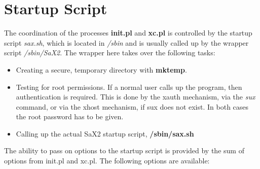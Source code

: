 \section{Startup Script}
\label{sec:sta}
The coordination of the processes \textbf{init.pl} and \textbf{xc.pl}
is controlled by the startup script \textit{sax.sh}, 
which is located in \textit{/sbin} and is usually called up by the 
wrapper script \textit{/sbin/SaX2}. The wrapper here takes over the
following tasks:
\begin{itemize}
\item Creating a secure, temporary directory with \textbf{mktemp}. 
\item Testing for root permissions. If a normal user calls up the program,
      then authentication is required. This is done by the xauth mechanism, via
      the  \textit{sux} command, or via the xhost mechanism, if sux does not
      exist. In both cases the root password has to be given.  
\item Calling up the actual SaX2 startup script, \textbf{/sbin/sax.sh}
\end{itemize}
The ability to pass on options to the startup script is provided by the sum of
options from init.pl and xc.pl. The following options are available:

